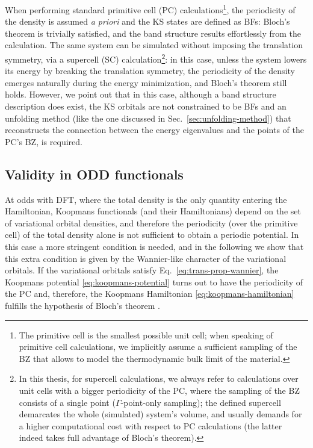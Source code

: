 When performing standard primitive cell (PC) calculations\footnote{The primitive cell is the smallest possible unit cell; when speaking of primitive cell calculations, we implicitly assume a sufficient sampling of the BZ that allows to model the thermodynamic bulk limit of the material.}, the periodicity of the density is assumed \emph{a priori} and the KS states are defined as BFs: Bloch's theorem is trivially satisfied, and the band structure results effortlessly from the calculation. The same system can be simulated without imposing the translation symmetry, via a supercell (SC) calculation\footnote{In this thesis, for supercell calculations, we always refer to calculations over unit cells with a bigger periodicity of the PC, where the sampling of the BZ consists of a single point ($\Gamma$-point-only sampling); the defined supercell demarcates the whole (simulated) system's volume, and usually demands for a higher computational cost with respect to PC calculations (the latter indeed takes full advantage of Bloch's theorem).}: in this case, unless the system lowers its energy by breaking the translation symmetry, the periodicity of the density emerges naturally during the energy minimization, and Bloch's theorem still holds. However, we point out that in this case, although a band structure description does exist, the KS orbitals are not constrained to be BFs and an unfolding method (like the one discussed in Sec.~\ref{sec:unfolding-method}) that reconstructs the connection between the energy eigenvalues and the points of the PC's BZ, is required.

\subsection{Validity in ODD functionals\label{sec:bloch-th-odd}}
At odds with DFT, where the total density is the only quantity entering the Hamiltonian, Koopmans functionals (and their Hamiltonians) depend on the set of variational orbital densities, and therefore the periodicity (over the primitive cell) of the total density alone is not sufficient to obtain a periodic potential. In this case a more stringent condition is needed, and in the following we show that this extra condition is given by the Wannier-like character of the variational orbitals. If the variational orbitals satisfy Eq.~\eqref{eq:trans-prop-wannier}, the Koopmans potential \eqref{eq:koopmans-potential} turns out to have the periodicity of the PC and, therefore, the Koopmans Hamiltonian \eqref{eq:koopmans-hamiltonian} fulfills the hypothesis of Bloch's theorem \cite{de_gennaro_blochs_2022}.

